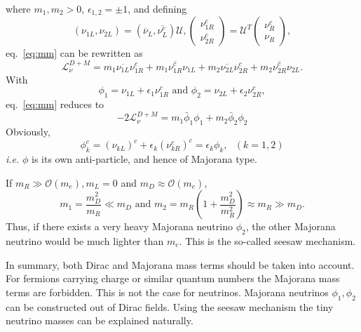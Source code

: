 where $m_{1}, m_{2} > 0$, $\epsilon_{1,2} = \pm 1$, and defining
\begin{equation}
  \label{eq:mvet}
  (\nu_{1L}, \nu_{2L}) = \left( \overline{\nu}_{L},                 \overline{\nu^{c}_{L}} \right) \mathcal{U},
  \left(\begin{array}{c} \nu^{c}_{1R} \\            
      \nu^{c}_{2R}\end{array}\right) = \mathcal{U}^{T}
  \left(\begin{array}{c} \nu^{c}_{R} \\ \nu_{R} \end{array}\right),
\end{equation}
eq.~\ref{eq:mm} can be rewritten as
\begin{equation}
  \label{eq:m12}
  \mathcal{L}_{\nu}^{D+M} = m_{1}\overline{\nu_{1L}}\nu^{c}_{1R} +  
  m_{1}\overline{\nu^{c}_{1R}}\nu_{1L} +
  m_{2}\overline{\nu_{2L}}\nu^{c}_{2R} +  
  m_{2}\overline{\nu^{c}_{2R}}\nu_{2L}.
\end{equation}
With
\begin{equation}
  \label{eq:mafi}
  \phi_{1} = \nu_{1L} + \epsilon_{1}\nu^{c}_{1R}
  \mbox{\ \ \ and \ \ \ }
  \phi_{2} = \nu_{2L} + \epsilon_{2}\nu^{c}_{2R},
\end{equation}
eq.~\ref{eq:mm} reduces to
\begin{equation}
  \label{eq:mv}
  -2\mathcal{L}_{\nu}^{D+M} = m_{1}\bar{\phi}_{1}\phi_{1} +
  m_{2}\bar{\phi}_{2}\phi_{2}
\end{equation}
Obviously,
\begin{equation}
  \label{eq:mach}
  \phi^{c}_{k} = (\nu_{kL})^{c} + \epsilon_{k}(\nu^{c}_{kR})^{c} =
  \epsilon_{k}\phi_{k}, ~~~ (k=1,2)
\end{equation}
\textit{i.e.} $\phi$ is its own anti-particle, and hence of Majorana type.

If $m_{R} \gg \mathcal{O}(m_{e}), m_{L}=0$ and $m_{D} \approx \mathcal{O}(m_{e})$,
\begin{equation}
  \label{eq:seesaw}
  m_{1} = \frac{m^{2}_{D}}{m_{R}}\ll m_{D}  \mbox{\ \ \ and \ \ \ }  
  m_{2} = m_{R}(1+\frac{m^{2}_{D}}{m^{2}_{R}}) \approx m_{R} \gg m_{D}.
\end{equation}
Thus, if there exists a very heavy Majorana neutrino $\phi_2$, the other Majorana neutrino would be much lighter than $m_e$. This is the so-called seesaw mechanism.

In summary, both Dirac and Majorana mass terms should be taken into account. For fermions carrying charge or similar quantum numbers the Majorana mass terms are forbidden. This is not the case for neutrinos. Majorana neutrinos $\phi_{1}, \phi_{2}$ can be constructed out of Dirac fields. Using the seesaw mechanism the tiny neutrino masses can be explained naturally.

